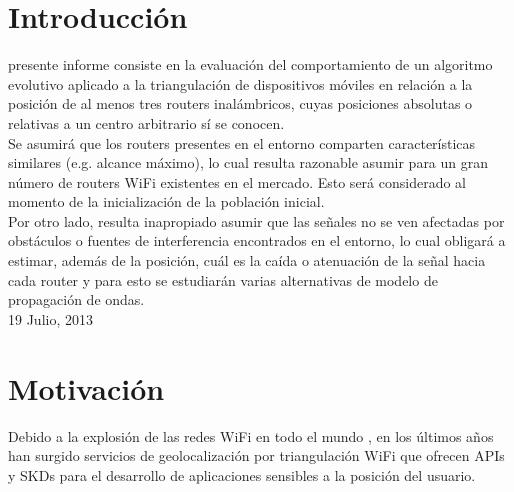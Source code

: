 \documentclass[journal]{IEEEtran}
\begin{document}
\section{Introducción}
% 
% 
% 
% 
 presente informe consiste en la evaluación del comportamiento de un algoritmo evolutivo aplicado a la triangulación de dispositivos móviles en relación a la posición de al menos tres routers inalámbricos, cuyas posiciones absolutas o relativas a un centro arbitrario sí se conocen.\\

Se asumirá que los routers presentes en el entorno comparten características similares (e.g. alcance máximo), lo cual resulta razonable asumir para un gran número de routers WiFi existentes en el mercado. Esto será considerado al momento de la inicialización de la población inicial.\\

Por otro lado, resulta inapropiado asumir que las señales no se ven afectadas por obstáculos o fuentes de interferencia encontrados en el entorno, lo cual obligará a estimar, además de la posición, cuál es la caída o atenuación de la señal hacia cada router y para esto se estudiarán varias alternativas de modelo de propagación de ondas.\\

\hfill 19 Julio, 2013

\section{Motivación}

Debido a la explosión de las redes WiFi en todo el mundo \cite{wifi:coverage}, en los últimos años han surgido servicios de geolocalización por triangulación WiFi \cite{wifi:positioning} que ofrecen APIs \cite{google:maps} y SKDs  \cite{skyhook:location} para el desarrollo de aplicaciones sensibles a la posición del usuario.\\
\end{document}
